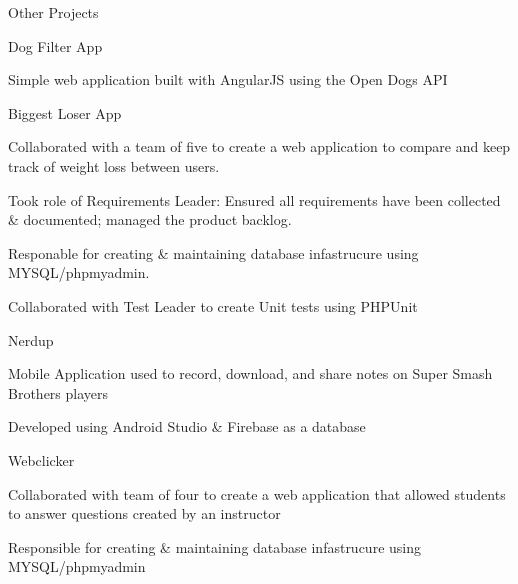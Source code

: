 \documentclass{resume} %
\begin{document}
\begin{rSection}{Other Projects}

    \begin{rSubsection}{Dog Filter App}{}{}{}
        \item Simple web application built with AngularJS using the Open Dogs API
    \end{rSubsection}

    \begin{rSubsection}{Biggest Loser App}{}{}{}
        \item Collaborated with a team of five to create a web application to compare and keep track of weight loss between users.
        \item Took role of Requirements Leader:  Ensured all requirements have been collected \& documented; managed the product backlog.
        \item Responable for creating \& maintaining database infastrucure using MYSQL/phpmyadmin.
        \item Collaborated with Test Leader to create Unit tests using PHPUnit
    \end{rSubsection}

    \begin{rSubsection}{Nerdup}{}{}{}
        \item Mobile Application used to record, download, and share notes on Super Smash Brothers players
        \item Developed using Android Studio \& Firebase as a database
    \end{rSubsection}

    \begin{rSubsection}{Webclicker}{}{}{}
        \item Collaborated with team of four to create a web application that allowed students to answer questions created by an instructor
        \item Responsible for creating \& maintaining database infastrucure using MYSQL/phpmyadmin
    \end{rSubsection}
\end{rSection}


\end{document}
